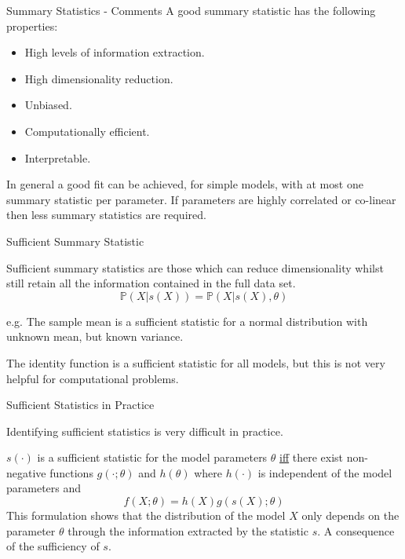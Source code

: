 \documentclass[aspectratio=169]{beamer}
\begin{document}
\begin{frame}{Summary Statistics - Comments}
  A good summary statistic has the following properties:
  \begin{multicols}{2}
    \begin{itemize}
      \item High levels of information extraction.
      \item High dimensionality reduction.
      \item Unbiased.
      \item Computationally efficient.
      \item Interpretable.
    \end{itemize}
  \end{multicols}
  In general a good fit can be achieved, for simple models, with at most one summary statistic per parameter. If parameters are highly correlated or co-linear then less summary statistics are required.
\end{frame}

\begin{frame}{Sufficient Summary Statistic}
  \par Sufficient summary statistics are those which can reduce dimensionality whilst still retain all the information contained in the full data set.
  \[ \mathbb{P}(X|s(X))=\mathbb{P}(X|s(X),\theta) \]
  \par e.g. The sample mean is a sufficient statistic for a normal distribution with unknown mean, but known variance.
  \par The identity function is a sufficient statistic for all models, but this is not very helpful for computational problems.
\end{frame}

\begin{frame}{Sufficient Statistics in Practice}
  \par Identifying sufficient statistics is very difficult in practice.
  \begin{theorem}
    $s(\cdot)$ is a sufficient statistic for the model parameters $\theta$ \underline{iff} there exist non-negative functions $g(\cdot;\theta)$ and $h(\theta)$ where $h(\cdot)$ is independent of the model parameters\footnotemark{} and
    \[ f(X;\theta)=h(X)g(s(X);\theta) \]
    This formulation shows that the distribution of the model $X$ only depends on the parameter $\theta$ through the information extracted by the statistic $s$. A consequence of the sufficiency of $s$.
  \end{theorem}
\end{frame}
\end{document}
